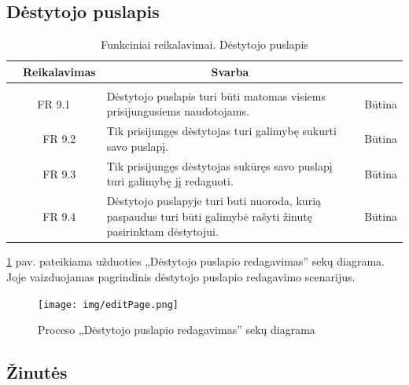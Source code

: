 \documentclass{VUMIFPSkursinis}
\begin{document}
\subsection{Dėstytojo puslapis}

	\begin{table}[H]
	\caption{Funkciniai reikalavimai. Dėstytojo puslapis}
	\begin{tabular}{|p{1cm}|p{1cm}|p{}|p{}|}
		\hline 
		\rowcolor{gray!50}
		\multicolumn{2}{|c|}{{\bfseries Kodas}}&
		\multicolumn{1}{c|}{{\bfseries Reikalavimas}}&
		\multicolumn{1}{c|}{{\bfseries Svarba}}\\
		\hline
		\rowcolor{lightgray}
		\multicolumn{4}{|c|}{Dėstytojo puslapis}\\		
		
		\hline
		\multicolumn{2}{|c|}{FR 9.1}&
		{Dėstytojo puslapis turi būti matomas visiems prisijungusiems naudotojams.
		}&		
		\multicolumn{1}{c|}{Būtina}\\
		\hline
		\multicolumn{1}{|c}{}&
		\multicolumn{1}{c|}{FR 9.2}&
		{Tik prisijungęs dėstytojas turi galimybę sukurti savo puslapį.
		}&		
		\multicolumn{1}{c|}{Būtina}\\
		\hline
		\multicolumn{1}{|c}{}&
		\multicolumn{1}{c|}{FR 9.3}&
		{Tik prisijungęs dėstytojas sukūręs savo puslapį turi galimybę jį redaguoti.
		}&
		\multicolumn{1}{c|}{Būtina}\\	
		\hline		
		\multicolumn{1}{|c}{}&
		\multicolumn{1}{c|}{FR 9.4}&
		{Dėstytojo puslapyje turi buti nuoroda, kurią paspaudus turi būti galimybė rašyti žinutę pasirinktam dėstytojui.
		}&
		\multicolumn{1}{c|}{Būtina}\\									
		\hline
	\end{tabular}		
\end{table}

\ref{fig:editpage} pav. pateikiama užduoties „Dėstytojo puslapio redagavimas” sekų diagrama. Joje vaizduojamas pagrindinis dėstytojo puslapio redagavimo scenarijus.
\begin{figure}[H]
	\centering
	\texttt{[image: img/editPage.png]}
	\caption{Proceso „Dėstytojo puslapio redagavimas” sekų diagrama}
	\label{fig:editpage}
\end{figure}

\subsection{Žinutės}
\end{document}
